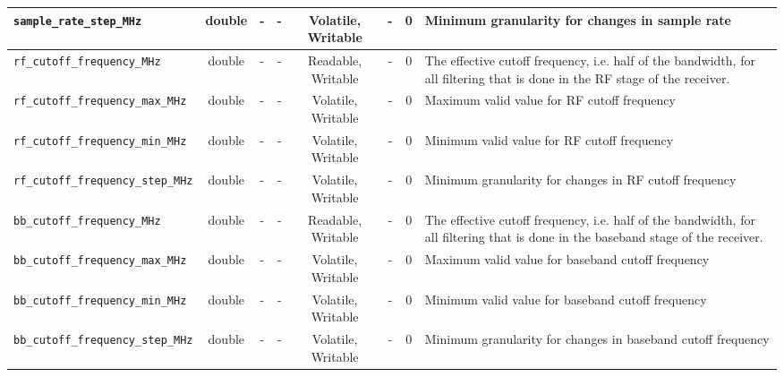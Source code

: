 \documentclass{article}
\begin{document}
\begin{landscape}
\begin{scriptsize}
\begin{tabular}{|p{4cm}|c|c|c|c|c|c|p{8cm}|}
			\hline
			\verb+sample_rate_step_MHz+         & double & -        & -          & Volatile, Writable & -           & 0       & Minimum granularity for changes in sample rate                                             \\
			\hline
			\verb+rf_cutoff_frequency_MHz+      & double & -        & -          & Readable, Writable  & -           & 0       & The effective cutoff frequency, i.e. half of the bandwidth, for all filtering that is done in the RF stage of the receiver.      \\
			\hline
			\verb+rf_cutoff_frequency_max_MHz+  & double & -        & -          & Volatile, Writable & -           & 0       & Maximum valid value for RF cutoff frequency                                                \\
			\hline
			\verb+rf_cutoff_frequency_min_MHz+  & double & -        & -          & Volatile, Writable & -           & 0       & Minimum valid value for RF cutoff frequency                                                \\
			\hline
			\verb+rf_cutoff_frequency_step_MHz+ & double & -        & -          & Volatile, Writable & -           & 0       & Minimum granularity for changes in RF cutoff frequency                                     \\
			\hline
			\verb+bb_cutoff_frequency_MHz+      & double & -        & -          & Readable, Writable  & -           & 0       & The effective cutoff frequency, i.e. half of the bandwidth, for all filtering that is done in the baseband stage of the receiver.\\
			\hline
			\verb+bb_cutoff_frequency_max_MHz+  & double & -        & -          & Volatile, Writable & -           & 0       & Maximum valid value for baseband cutoff frequency                                          \\
			\hline
			\verb+bb_cutoff_frequency_min_MHz+  & double & -        & -          & Volatile, Writable & -           & 0       & Minimum valid value for baseband cutoff frequency                                          \\
			\hline
			\verb+bb_cutoff_frequency_step_MHz+ & double & -        & -          & Volatile, Writable & -           & 0       & Minimum granularity for changes in baseband cutoff frequency                               \\
			\hline
		\end{tabular}
	\end{scriptsize}


\end{landscape}
\end{document}
